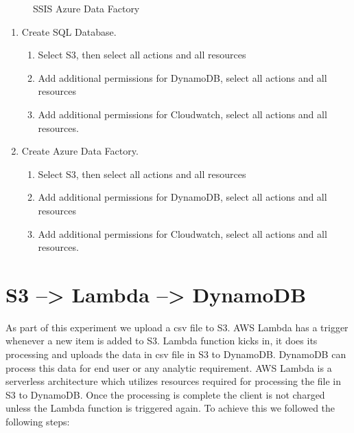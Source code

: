 \begin{figure}[!htb]
    \caption{\label{fig:SSIS_ADF} SSIS Azure Data Factory}
\end{figure}

\begin{enumerate}
 \item Create SQL Database. 
 \begin{enumerate}
 	\item Select S3, then select all actions and all resources
	\item Add additional permissions for DynamoDB, select all actions and all resources
	\item Add additional permissions for Cloudwatch, select all actions and all resources.
 \end{enumerate}  
 \item Create Azure Data Factory. 
 \begin{enumerate}
 	\item Select S3, then select all actions and all resources
	\item Add additional permissions for DynamoDB, select all actions and all resources
	\item Add additional permissions for Cloudwatch, select all actions and all resources.
 \end{enumerate}  
\end{enumerate}
 
\section{S3 --> Lambda --> DynamoDB}
As part of this experiment we upload a csv file to S3. AWS Lambda has a trigger whenever a new item is added to S3. Lambda function kicks in, it does its processing and uploads the data in csv file in S3 to DynamoDB. DynamoDB can process this data for end user or any analytic requirement. AWS Lambda is a serverless architecture which utilizes resources required for processing the file in S3 to DynamoDB. Once the processing is complete the client is not charged unless the Lambda function is triggered again. To achieve this we followed the following steps: \cite{ReadCSVFile}

